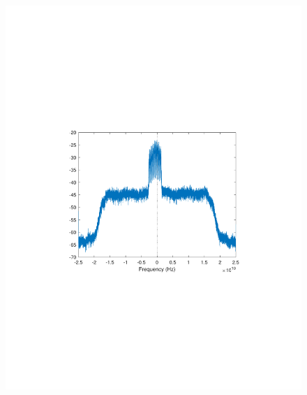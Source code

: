 \begin{refsection}
\begin{figure}[H]
	\centering
	\begin{minipage}{0.30\textwidth}
		\centering
		\includegraphics[clip, trim=4cm 8cm 4cm 8cm, width=1\textwidth]{./sdf/m_qam_system/figures/expResults/intradyne/1_4GBdInSig13dB_AfFec.pdf}
		\label{fig:4GBdEyeAftFec}
	\end{minipage}
	\begin{minipage}{0.30\textwidth}
		\centering

\end{minipage}
\end{figure}
\end{refsection}
